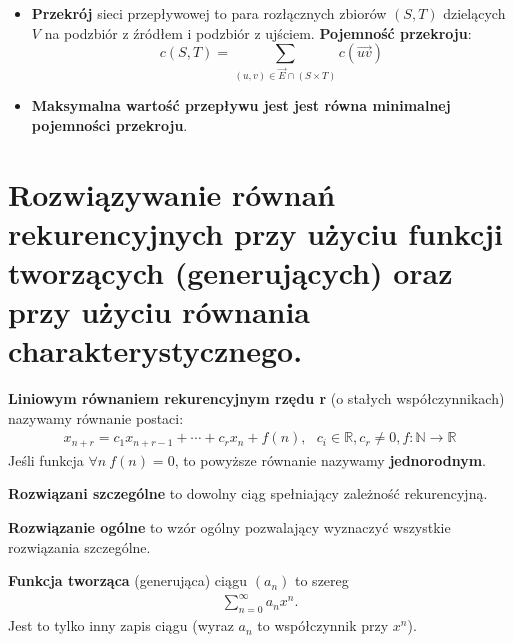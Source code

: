 \documentclass[main.tex]{subfiles}
\begin{document}
\begin{itemize}
        \item \textbf{Przekrój} sieci przepływowej to para rozłącznych zbiorów $(S, T)$ dzielących $V$ na podzbiór z
        źródłem i podzbiór z ujściem. \textbf{Pojemność przekroju}:
        \[c(S, T) = \sum_{(u,v) \in \vec{E} \cap (S \times T)} c(\vec{uv})\]

        \item \textbf{Maksymalna wartość przepływu jest jest równa minimalnej pojemności przekroju}.
    \end{itemize}


    \section{Rozwiązywanie równań rekurencyjnych przy użyciu funkcji tworzących (generujących) oraz przy użyciu
    równania charakterystycznego.}

    \begin{definition}
        \textbf{Liniowym równaniem rekurencyjnym rzędu r} (o stałych współczynnikach) nazywamy równanie postaci:
        \begin{align*}
            x_{n+r} = c_1 x_{n+r-1} +  \cdots + c_r x_n + f(n), ~~~ c_i  \in \mathbb{R}, c_r \neq 0, f:  \mathbb{N} \rightarrow \mathbb{R}
        \end{align*}
        Jeśli funkcja $\forall n ~ f(n) = 0$, to powyższe równanie nazywamy \textbf{jednorodnym}.

        \textbf{Rozwiązani szczególne} to dowolny ciąg spełniający zależność rekurencyjną.

        \textbf{Rozwiązanie ogólne} to wzór ogólny pozwalający wyznaczyć wszystkie rozwiązania szczególne.
    \end{definition}

    \begin{definition}
        \textbf{Funkcja tworząca} (generująca) ciągu $(a_n)$ to szereg
        \begin{align*}
            \sum_{n=0}^{\infty} a_n x^n.
        \end{align*}
        Jest to tylko inny zapis ciągu (wyraz $a_n$ to współczynnik przy $x^n$).
    \end{definition}
\end{document}
